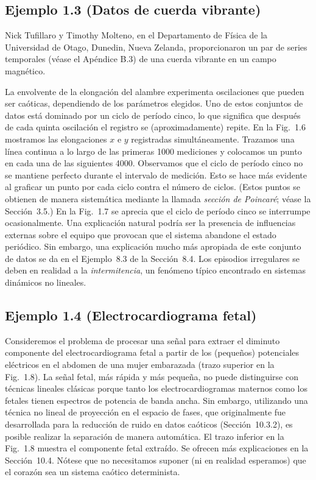 \documentclass[10pt,a4paper]{book}
\begin{document}
\subsection*{Ejemplo 1.3 (Datos de cuerda vibrante)}

Nick Tufillaro y Timothy Molteno, en el Departamento de Física de la Universidad de Otago, Dunedin, Nueva Zelanda, proporcionaron un par de series temporales (véase el Apéndice B.3) de una cuerda vibrante en un campo magnético.

La envolvente de la elongación del alambre experimenta oscilaciones que pueden ser caóticas, dependiendo de los parámetros elegidos. Uno de estos conjuntos de datos está dominado por un ciclo de período cinco, lo que significa que después de cada quinta oscilación el registro se (aproximadamente) repite. En la Fig.~1.6 mostramos las elongaciones $x$ e $y$ registradas simultáneamente. Trazamos una línea continua a lo largo de las primeras 1000 mediciones y colocamos un punto en cada una de las siguientes 4000. Observamos que el ciclo de período cinco no se mantiene perfecto durante el intervalo de medición. Esto se hace más evidente al graficar un punto por cada ciclo contra el número de ciclos. (Estos puntos se obtienen de manera sistemática mediante la llamada \emph{sección de Poincaré}; véase la Sección~3.5.) En la Fig.~1.7 se aprecia que el ciclo de período cinco se interrumpe ocasionalmente. Una explicación natural podría ser la presencia de influencias externas sobre el equipo que provocan que el sistema abandone el estado periódico. Sin embargo, una explicación mucho más apropiada de este conjunto de datos se da en el Ejemplo~8.3 de la Sección~8.4. Los episodios irregulares se deben en realidad a la \emph{intermitencia}, un fenómeno típico encontrado en sistemas dinámicos no lineales.

\subsection*{Ejemplo 1.4 (Electrocardiograma fetal)}

Consideremos el problema de procesar una señal para extraer el diminuto componente del electrocardiograma fetal a partir de los (pequeños) potenciales eléctricos en el abdomen de una mujer embarazada (trazo superior en la Fig.~1.8). La señal fetal, más rápida y más pequeña, no puede distinguirse con técnicas lineales clásicas porque tanto los electrocardiogramas maternos como los fetales tienen espectros de potencia de banda ancha. Sin embargo, utilizando una técnica no lineal de proyección en el espacio de fases, que originalmente fue desarrollada para la reducción de ruido en datos caóticos (Sección~10.3.2), es posible realizar la separación de manera automática. El trazo inferior en la Fig.~1.8 muestra el componente fetal extraído. Se ofrecen más explicaciones en la Sección~10.4. Nótese que no necesitamos suponer (ni en realidad esperamos) que el corazón sea un sistema caótico determinista. 
\end{document}

